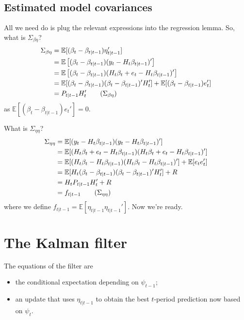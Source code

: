 \documentclass[
  letterpaper,
]{book}
\providecommand{\tightlist}{%
  \setlength{\itemsep}{0pt}\setlength{\parskip}{0pt}}\usepackage{longtable,booktabs,array}
\begin{document}
\hypertarget{estimated-model-covariances}{%
\subsection{Estimated model
covariances}\label{estimated-model-covariances}}

All we need do is plug the relevant expressions into the regression
lemma. So, what is \(\Sigma_{\beta\eta}\)? \begin{align}
\Sigma_{\beta\eta} &= \mathbb{E}[(\beta_t-\beta_{t|t-1}) \eta_{t|t-1}'] \\
&= \mathbb{E}\left[(\beta_t-\beta_{t|t-1}) (y_t-H_t\beta_{t|t-1})'\right] \\
&= \mathbb{E}\left[(\beta_t-\beta_{t|t-1}) (H_t\beta_t+e_t-H_t\beta_{t|t-1})'\right] \\
&= \mathbb{E}[(\beta_t-\beta_{t|t-1}) (\beta_t-\beta_{t|t-1})'H_t'] + \mathbb{E}[(\beta_t - \beta_{t|t-1}) e_t'] \\
&= P_{t|t-1} H_t' \tag{$\Sigma_{\beta\eta}$} 
\end{align} as \(\mathbb{E}[(\beta_t - \beta_{t|t-1})e_t']=0\).

What is \(\Sigma_{\eta\eta}\)? \begin{align}
\Sigma_{\eta\eta} &= \mathbb{E}[(y_t-H_t \beta_{t|t-1})(y_t-H_t\beta_{t|t-1})'] \\
                  &= \mathbb{E}[(H_t\beta_t+e_t-H_t\beta_{t|t-1})(H_t\beta_t+e_t-H_t\beta_{t|t-1})'] \\
                  &= \mathbb{E}[(H_t\beta_t-H_t \beta_{t|t-1})(H_t\beta_t-H_t\beta_{t|t-1})'] + \mathbb{E}[e_t e_t'] \\
                  &= \mathbb{E}[H_t(\beta_t-\beta_{t|t-1})(\beta_t-\beta_{t|t-1})'H_t'] + R \\
                  &= H_t P_{t|t-1} H_t' + R \\
                  &= f_{t|t-1} \tag{$\Sigma_{\eta\eta}$} \label{svv}
\end{align} where we define
\(f_{t|t-1}=\mathbb{E}[\eta_{t|t-1}\eta_{t|t-1}']\). Now we're ready.

\hypertarget{the-kalman-filter}{%
\section{The Kalman filter}\label{the-kalman-filter}}

The equations of the filter are

\begin{itemize}
\tightlist
\item
  the conditional expectation depending on \(\psi_{t-1}\);
\item
  an update that uses \(\eta_{t|t-1}\) to obtain the best \(t\)-period
  prediction now based on \(\psi_t\).
\end{itemize}
\end{document}

